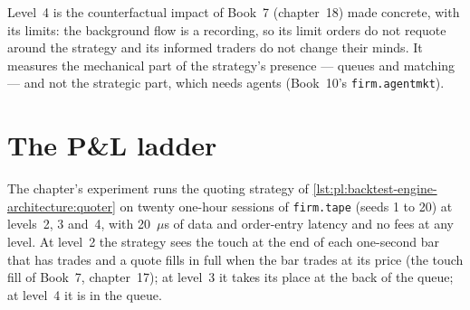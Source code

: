 \label{lst:pl:backtest-engine-architecture:level4}

Level~4 is the counterfactual impact of Book~7 (chapter~18) made concrete, with its limits: the background flow is a recording, so its
limit orders do not requote around the strategy and its informed traders do not change their minds. It measures the mechanical part of
the strategy's presence --- queues and matching --- and not the strategic part, which needs agents (Book~10's \texttt{firm.agentmkt}).

\section{The P\&L ladder}

The chapter's experiment runs the quoting strategy of \cref{lst:pl:backtest-engine-architecture:quoter} on twenty one-hour sessions of
\texttt{firm.tape} (seeds 1 to 20) at levels~2, 3 and~4, with 20~$\mu$s of data and order-entry latency and no fees at any level. At level~2
the strategy sees the touch at the end of each one-second bar that has trades and a quote fills in full when the bar trades at its price
(the touch fill of Book~7, chapter~17); at level~3 it takes its place at the back of the queue; at level~4 it is in the queue.

\begin{omfigure}

\label{fig:pl:backtest-engine-architecture:ladder}
\end{omfigure}

